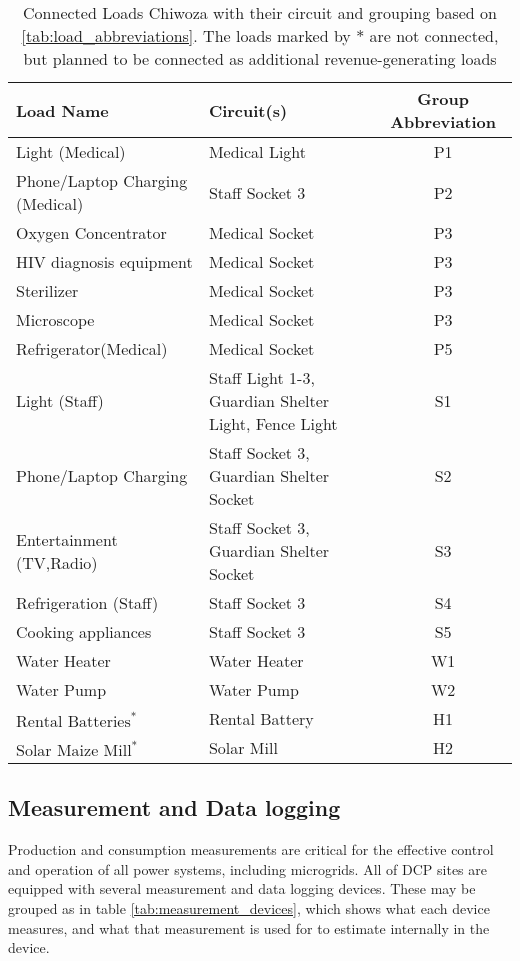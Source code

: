 \begin{table}[ht]
    \centering
    \small %
    \begin{tabularx}{\textwidth}{|X|X|c|}
         \textbf{Load Name} & \textbf{Circuit(s)} & \textbf{Group Abbreviation}\\
         \hline
         Light (Medical) & Medical Light & P1\\
         \hline
         Phone/Laptop Charging (Medical)   &  Staff Socket 3 & P2\\
         \hline
         Oxygen Concentrator & Medical Socket & P3\\
         \hline
         HIV diagnosis equipment & Medical Socket & P3\\
         \hline
         Sterilizer & Medical Socket & P3\\
         \hline
         Microscope & Medical Socket & P3\\
         \hline
         Refrigerator(Medical) & Medical Socket & P5\\
         \hline
         Light (Staff) & Staff Light 1-3, Guardian Shelter Light, Fence Light & S1\\
         \hline
         Phone/Laptop Charging  &  Staff Socket 3, Guardian Shelter Socket  & S2\\
         \hline
         Entertainment (TV,Radio) & Staff Socket 3, Guardian Shelter Socket & S3\\         
         \hline
         Refrigeration (Staff) & Staff Socket 3 & S4\\
         \hline
         Cooking appliances & Staff Socket 3 & S5\\
         \hline
         Water Heater & Water Heater & W1\\
         \hline
         Water Pump & Water Pump & W2\\
         \hline
         $\text{Rental Batteries}^*$ & Rental Battery & H1\\
         \hline
         $\text{Solar Maize Mill}^*$ & Solar Mill & H2
    \end{tabularx}
    \caption[Loads at Chiwoza]{Connected Loads Chiwoza with their circuit and grouping based on \autoref{tab:load_abbreviations}. The loads marked by $*$ are not connected, but planned to be connected as additional revenue-generating loads}
    \label{tab:loads_chiwoza}
\end{table}

\subsection{Measurement and Data logging}\label{seq:data_collection}
Production and consumption measurements are critical for the effective control and operation of all power systems, including microgrids. All of DCP sites are equipped with several measurement and data logging devices. These may be grouped as in table \ref{tab:measurement_devices}, which shows what each device measures, and what that measurement is used for to estimate internally in the device.\\

